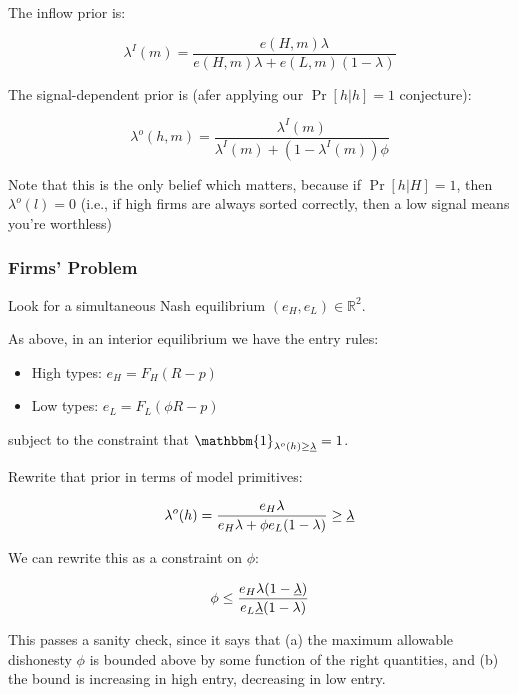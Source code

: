 \documentclass{article}
\begin{document}
The inflow prior is: 

\begin{equation}
    \lambda^I(m) = \frac{e(H, m)\lambda}{e(H,m)\lambda + e(L, m)(1-\lambda)}
\end{equation}

The signal-dependent prior is (afer applying our $\Pr[h | h] = 1$ conjecture): 

\begin{equation}
    \lambda^o(h, m) = \frac{\lambda^I(m)}{\lambda^I(m) + (1-\lambda^I(m))\phi}
\end{equation}

Note that this is the only belief which matters, because if $\Pr[h | H] = 1$, then $\lambda^o(l) = 0$ (i.e., if high firms are always sorted correctly, then a low signal means you're worthless)

\subsubsection*{Firms' Problem}

Look for a simultaneous Nash equilibrium $(e_H, e_L) \in \mathbb{R}^2$. 

As above, in an interior equilibrium we have the entry rules: 

\begin{itemize}
    \item High types: $e_H = F_H(R - p)$
    \item Low types: $e_L = F_L(\phi R - p)$ 
\end{itemize}

subject to the constraint that $\mathbbm{1}_{\lambda^o(h) \geq \uline{\lambda}} = 1$.

Rewrite that prior in terms of model primitives: 

\begin{equation}
    \lambda^o(h) = \frac{e_H \lambda}{e_H \lambda + \phi e_L (1 - \lambda)} \geq \uline{\lambda}
\end{equation}

We can rewrite this as a constraint on $\phi$: 

\begin{equation}
    \phi \leq \frac{e_H \lambda (1 - \uline{\lambda})}{e_L \uline{\lambda} (1 - \lambda)}
\end{equation} 

This passes a sanity check, since it says that (a) the maximum allowable dishonesty $\phi$ is bounded above by some function of the right quantities, and (b) the bound is increasing in high entry, decreasing in low entry.
\end{document}
